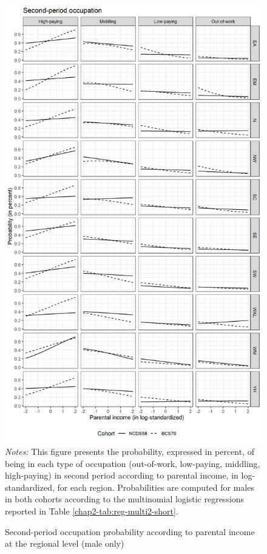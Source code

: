 \begin{figure}[!htb]
    \centering
    \caption{Second-period occupation probability according to parental income at the regional level (male only)}
    \label{chap2-fig:reg-multi2-pinc-male}
    \includegraphics[width=.7\linewidth]{chap2/graphic/reg-multi2-pinc-male.png}
    \vspace{-3em}
	\justify\singlespacing\footnotesize{\textit{Notes:} This figure presents the probability, expressed in percent, of being in each type of occupation (out-of-work, low-paying, middling, high-paying) in second period according to parental income, in log-standardized, for each region.
	Probabilities are computed for males in both cohorts according to the multinomial logistic regressions reported in Table \ref{chap2-tab:reg-multi2-short}.}
\end{figure}

